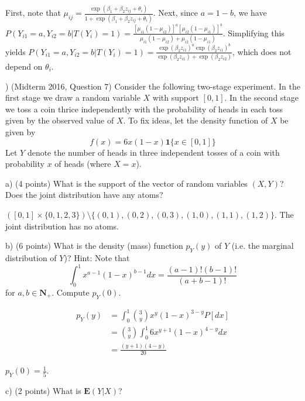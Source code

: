 \documentclass[12pt,english]{article}
\begin{document}
First, note that $\mu_{ij} = \frac{\exp(\beta_{1} + \beta_{2} z_{ij} + \theta_{i})}{1 + \exp(\beta_{1} + \beta_{2} z_{ij} + \theta_{i})}$. Next, since $a = 1 - b$, we have $P(Y_{i1} = a, Y_{i2} = b | T(Y_{i}) = 1) = \frac{[\mu_{i1}(1 - \mu_{i2})]^{a} [\mu_{i2}(1 - \mu_{i1})]^{b}}{\mu_{i1}(1 - \mu_{i2}) + \mu_{i2}(1 - \mu_{i1})}$. Simplifying this yields $P(Y_{i1} = a, Y_{i2} = b | T(Y_{i}) = 1) = \frac{\exp(\beta_{2} z_{i1})^{a} \exp(\beta_{2} z_{i1})^{b}}{\exp(\beta_{2} z_{i1}) + \exp(\beta_{2} z_{i2})}$, which does not depend on $\theta_{i}$.

\vspace{1em}
) (Midterm 2016, Question 7) Consider the following two-stage experiment.  In the first stage we draw a random variable $X$ with support $[0,1]$.  In the second stage we toss a coin thrice independently with the probability of heads in each toss given by the observed value of $X$. To fix ideas, let the density function of $X$ be given by
$$f(x) = 6x(1 - x) \mathbf{1} \{ x \in [0, 1] \}$$
Let $Y$ denote the number of heads in three independent tosses of a coin with probability $x$ of heads (where $X = x$).

a) (4 points)  What is the support of the vector of random variables $(X,Y)$?  Does the joint distribution have any atoms?
\vspace{1em}

$([0, 1] \times \{0, 1, 2, 3 \}) \setminus \{ (0, 1), (0, 2), (0, 3), (1, 0), (1, 1), (1, 2) \}$. The joint distribution has no atoms.

\vspace{1em}
b) (6 points)  What is the density (mass) function $p_{Y}(y)$ of $Y$ (i.e.  the marginal distribution of $Y$)? Hint: Note that
$$ \int_{0}^{1} x^{a-1}(1-x)^{b-1}dx = \frac{(a-1)!(b-1)!}{(a + b - 1)!} $$
for $a, b \in \mathbf{N}_{+}$. Compute $p_{Y}(0)$.
\vspace{1em}

\begin{align*}
p_{Y}(y) & = \int_{0}^{1} \binom{3}{y} x^{y} (1 - x)^{3 - y} P[dx] \\
& = \binom{3}{y} \int_{0}^{1} 6x^{y + 1} (1 - x)^{4 - y} dx \\
& = \frac{(y + 1)(4 - y)}{20}
\end{align*}

$p_{Y}(0) = \frac{1}{5}$.

\vspace{1em}
c) (2 points) What is $\mathbf{E}(Y|X)$?
\vspace{1em}
\end{document}
